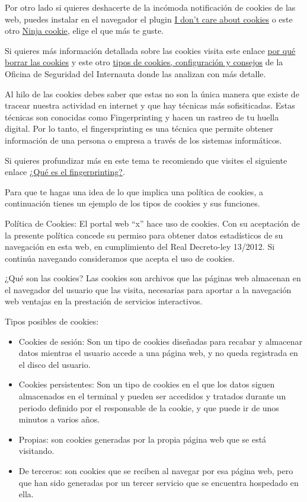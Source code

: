 \documentclass[
  spanish,
  a4paper,
  openany]{book}
\begin{document}
Por otro lado si quieres deshacerte de la incómoda notificación de cookies de las web, puedes instalar en el navegador el plugin \href{https://www.i-dont-care-about-cookies.eu/}{I don't care about cookies} o este otro \href{https://ninja-cookie.com/}{Ninja cookie}, elige el que más te guste.

Si quieres más información detallada sobre las cookies visita este enlace \href{https://www.osi.es/es/actualidad/blog/2019/09/11/por-que-borrar-las-cookies-del-navegador}{por qué borrar las cookies} y este otro \href{https://www.osi.es/es/actualidad/blog/2018/07/18/entre-cookies-y-privacidad}{tipos de cookies, configuración y consejos} de la Oficina de Seguridad del Internauta donde las analizan con más detalle.

Al hilo de las cookies debes saber que estas no son la única manera que existe de tracear nuestra actividad en internet y que hay técnicas más sofisiticadas. Estas técnicas son conocidas como Fingerprinting y hacen un rastreo de tu huella digital. Por lo tanto, el fingersprinting es una técnica que permite obtener información de una persona o empresa a través de los sistemas informáticos.

Si quieres profundizar más en este tema te recomiendo que visites el siguiente enlace \href{https://protecciondatos-lopd.com/empresas/fingerprinting-que-es/}{¿Qué es el fingerprinting?}.

Para que te hagas una idea de lo que implica una política de cookies, a continuación tienes un ejemplo de los tipos de cookies y sus funciones.

Política de Cookies:
El portal web ``x'' hace uso de cookies. Con su aceptación de la presente política concede su permiso para obtener datos estadísticos de su navegación en esta web, en cumplimiento del Real Decreto-ley 13/2012. Si continúa navegando consideramos que acepta el uso de cookies.

¿Qué son las cookies?
Las cookies son archivos que las páginas web almacenan en el navegador del usuario que las visita, necesarias para aportar a la navegación web ventajas en la prestación de servicios interactivos.

Tipos posibles de cookies:

\begin{itemize}
\item
  Cookies de sesión: Son un tipo de cookies diseñadas para recabar y almacenar datos mientras el usuario accede a una página web, y no queda registrada en el disco del usuario.
\item
  Cookies persistentes: Son un tipo de cookies en el que los datos siguen almacenados en el terminal y pueden ser accedidos y tratados durante un periodo definido por el responsable de la cookie, y que puede ir de unos minutos a varios años.
\item
  Propias: son cookies generadas por la propia página web que se está visitando.
\item
  De terceros: son cookies que se reciben al navegar por esa página web, pero que han sido generadas por un tercer servicio que se encuentra hospedado en ella.
\end{itemize}
\end{document}
